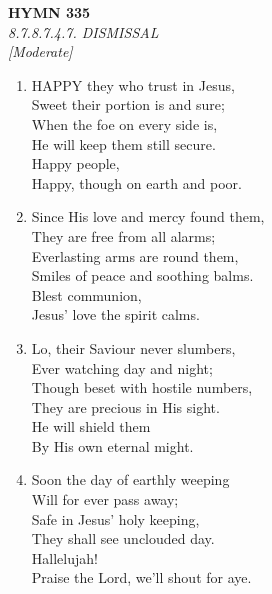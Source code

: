 \newpage
\begin{center}
    {\Large \textbf{HYMN 335}}
    \\
    \textit{8.7.8.7.4.7. DISMISSAL}
    \\
    \textit{\small [Moderate]}
\end{center}
\vspace{1em}

\begin{enumerate}
    \item HAPPY they who trust in Jesus, \\
        Sweet their portion is and sure; \\
        When the foe on every side is, \\
        He will keep them still secure. \\
        Happy people, \\
        Happy, though on earth and poor.

    \item Since His love and mercy found them, \\
        They are free from all alarms; \\
        Everlasting arms are round them, \\
        Smiles of peace and soothing balms. \\
        Blest communion, \\
        Jesus' love the spirit calms.

    \item Lo, their Saviour never slumbers, \\
        Ever watching day and night; \\
        Though beset with hostile numbers, \\
        They are precious in His sight. \\
        He will shield them \\
        By His own eternal might.

    \item Soon the day of earthly weeping \\
        Will for ever pass away; \\
        Safe in Jesus' holy keeping, \\
        They shall see unclouded day. \\
        Hallelujah! \\
        Praise the Lord, we'll shout for aye.

\end{enumerate}

